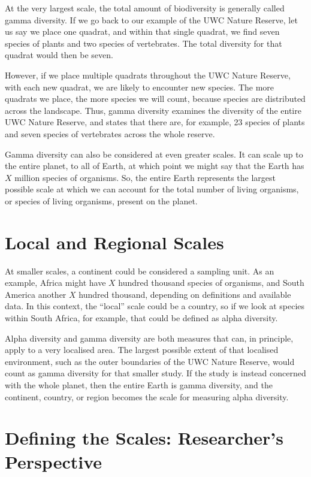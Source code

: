 \documentclass[
  10pt,
]{book}
\begin{document}
At the very largest scale, the total amount of biodiversity is generally
called gamma diversity. If we go back to our example of the UWC Nature
Reserve, let us say we place one quadrat, and within that single
quadrat, we find seven species of plants and two species of vertebrates.
The total diversity for that quadrat would then be seven.

However, if we place multiple quadrats throughout the UWC Nature
Reserve, with each new quadrat, we are likely to encounter new species.
The more quadrats we place, the more species we will count, because
species are distributed across the landscape. Thus, gamma diversity
examines the diversity of the entire UWC Nature Reserve, and states that
there are, for example, 23 species of plants and seven species of
vertebrates across the whole reserve.

Gamma diversity can also be considered at even greater scales. It can
scale up to the entire planet, to all of Earth, at which point we might
say that the Earth has \(X\) million species of organisms. So, the
entire Earth represents the largest possible scale at which we can
account for the total number of living organisms, or species of living
organisms, present on the planet.

\section{Local and Regional Scales}\label{local-and-regional-scales}

At smaller scales, a continent could be considered a sampling unit. As
an example, Africa might have \(X\) hundred thousand species of
organisms, and South America another \(X\) hundred thousand, depending
on definitions and available data. In this context, the ``local'' scale
could be a country, so if we look at species within South Africa, for
example, that could be defined as alpha diversity.

Alpha diversity and gamma diversity are both measures that can, in
principle, apply to a very localised area. The largest possible extent
of that localised environment, such as the outer boundaries of the UWC
Nature Reserve, would count as gamma diversity for that smaller study.
If the study is instead concerned with the whole planet, then the entire
Earth is gamma diversity, and the continent, country, or region becomes
the scale for measuring alpha diversity.

\section{Defining the Scales: Researcher's
Perspective}\label{defining-the-scales-researchers-perspective}
\end{document}

